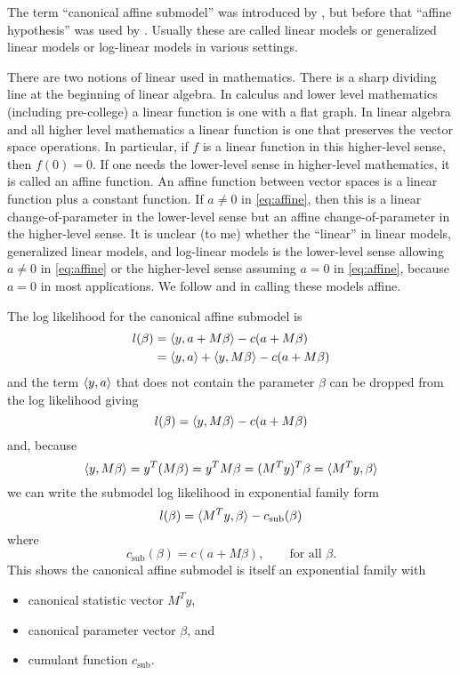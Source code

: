The term ``canonical affine submodel'' was introduced by \citet{aster1},
but before that ``affine hypothesis'' was used
by \citet[Section~8.2]{barndorff-nielsen}.
Usually these are called linear models or generalized linear models or
log-linear models in various settings.

There are two notions of linear used in mathematics.  There is a
sharp dividing line at the beginning of linear algebra.  In calculus
and lower level mathematics (including pre-college) a linear function
is one with a flat graph.  In linear algebra and all higher level mathematics
a linear function is one that preserves the vector space operations.
In particular, if $f$ is a linear function in this higher-level sense,
then $f(0) = 0$.  If one needs the lower-level sense in higher-level
mathematics, it is called an affine function.  An affine function
between vector spaces is
a linear function plus a constant function.  If $a \neq 0$
in \eqref{eq:affine}, then this is a linear change-of-parameter in the
lower-level sense but an affine change-of-parameter in the higher-level sense.
It is unclear (to me) whether the ``linear'' in linear models, generalized
linear models, and log-linear models is the lower-level sense allowing
$a \neq 0$ in \eqref{eq:affine} or the higher-level sense assuming $a = 0$
in \eqref{eq:affine}, because $a = 0$ in most applications.
We follow \citet{aster1} and \citet{barndorff-nielsen}
in calling these models affine.

The log likelihood for the canonical affine submodel is
\begin{align*}
   l(\beta)
   & =
   \langle y, a + M \beta \rangle - c(a + M \beta)
   \\
   & =
   \langle y, a \rangle + \langle y, M \beta \rangle - c(a + M \beta)
\end{align*}
and the term $\langle y, a \rangle$ that does not contain the parameter $\beta$
can be dropped from the log likelihood giving
$$
   l(\beta)
   =
   \langle y, M \beta \rangle - c(a + M \beta)
$$
and, because
$$
   \langle y, M \beta \rangle = y^T (M \beta) = y^T M \beta = (M^T y)^T \beta
   = \langle M^T y, \beta \rangle
$$
we can write the submodel log likelihood in exponential family form
\begin{equation} \label{eq:submodel}
   l(\beta)
   =
   \langle M^T y, \beta \rangle - c_\text{sub}(\beta)
\end{equation}
where
\begin{equation} \label{eq:submodel-cumfun}
   c_\text{sub}(\beta)
   =
   c(a + M \beta), \qquad \text{for all $\beta$}.
\end{equation}
This shows the canonical affine submodel is itself an exponential family with
\begin{itemize}
\item canonical statistic vector $M^T y$,
\item canonical parameter vector $\beta$, and
\item cumulant function $c_\text{sub}$.
\end{itemize}

